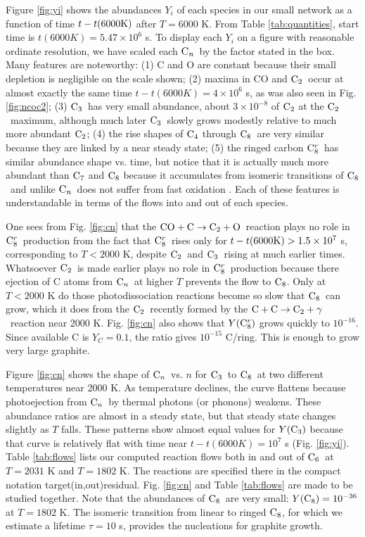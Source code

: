 \documentclass[manuscript]{aastex}
\newcommand{\ctwo}{{\rm C}_2}
\newcommand{\cthree}{{\rm C}_3}
\newcommand{\cfour}{{\rm C}_4}
\newcommand{\csix}{{\rm C}_6}
\newcommand{\cseven}{{\rm C}_7}
\newcommand{\ceight}{{\rm C}_8}
\newcommand{\ceightr}{{\rm C}_8^r}
\newcommand{\cenn}{{\rm C}_n}
\newcommand{\twoctoctwo}{${\rm C} + {\rm C} \to \ctwo + \gamma$}
\newcommand{\coctoctwo}{${\rm CO} + {\rm C} \to \ctwo + {\rm O}$}
\begin{document}
Figure \ref{fig:yi}
shows the abundances $Y_i$ of each species in our small network as a
function of time $t-t(6000 {\rm K})$ after $T=6000$ K.
From Table \ref{tab:quantities},
start time is $t(6000K) =5.47 \times 10^6$ s.
To display each $Y_i$ on a figure with
reasonable ordinate resolution, we have scaled each $\cenn$\ by the factor
stated in the box. Many features are noteworthy: (1) C and O are constant
because their small depletion is negligible on the scale shown;
(2) maxima in CO and $\ctwo$\ occur at almost exactly the same time
$t-t(6000K)= 4 \times 10^6$ s, as was also seen in Fig. \ref{fig:ncoc2};
(3) $\cthree$\ has very small abundance, about $3 \times 10^{-8}$ of $\ctwo$
at the $\ctwo$\ maximum, although much later $\cthree$\ slowly grows modestly
relative to much more abundant $\ctwo$; (4) the rise shapes of $\cfour$
through $\ceight$\ are very similar because they are linked by a near steady
state; (5) the ringed carbon $\ceightr$\ has similar abundance shape vs. time,
but notice that it is actually much more abundant than $\cseven$ and
$\ceight$ because it accumulates from isomeric transitions of $\ceight$\
and unlike $\cenn$\ does not
suffer from fast oxidation \citep{1999Sci...283.1290C}. Each of these
features is understandable in terms of the flows into and out of each species. 

One sees from Fig. \ref{fig:cn} that the \coctoctwo\ reaction plays no
role in $\ceightr$\ production from the fact that $\ceightr$\ rises only for
$t - t(6000 {\rm K}) > 1.5 \times 10^7$ s, corresponding to $T < 2000$ K,
despite $\ctwo$\ and $\cthree$\ rising at much earlier times.
Whatsoever $\ctwo$\ is made earlier plays no role in $\ceightr$\ production
because there ejection of C atoms from $\cenn$\ at higher $T$ prevents the
flow to $\ceight$.  Only at $T < 2000$ K do those photodissociation reactions
become so slow that $\ceight$\ can grow, which it does from the $\ctwo$\
recently
formed by the \twoctoctwo\ reaction near 2000 K.  Fig. \ref{fig:cn} also shows
that $Y(\ceightr)$
grows quickly to $10^{-16}$.  Since available C is $Y_C = 0.1$,
the ratio gives $10^{-15}$ C/ring.  This is enough to grow very large
graphite.

Figure \ref{fig:cn} shows the shape of $\cenn$\ vs. $n$ for $\cthree$\ to
$\ceight$\ at two different temperatures near 2000 K. As temperature declines,
the curve flattens because photoejection from $\cenn$\ by thermal photons
(or phonons) weakens. These abundance ratios are almost in a steady state,
but that steady state changes slightly as $T$ falls. These patterns show
almost equal values for $Y(\cthree)$ because that curve is relatively flat
with time near $t-t(6000K) = 10^7$ s (Fig. \ref{fig:yi}).
Table \ref{tab:flows} lists our computed reaction flows both in and out of
$\csix$\ at $T = 2031$ K and $T = 1802$ K.
The reactions are specified there in the
compact notation target(in,out)residual. Fig. \ref{fig:cn} and
Table \ref{tab:flows} are made to be studied together.
Note that the abundances of $\ceight$\ are very small:
$Y(\ceight)= 10^{-36}$ at $T = 1802$ K.
The isomeric transition from linear to
ringed $\ceight$, for which we estimate a lifetime $\tau = 10$ s,
provides the nucleations for graphite growth.
\end{document}
